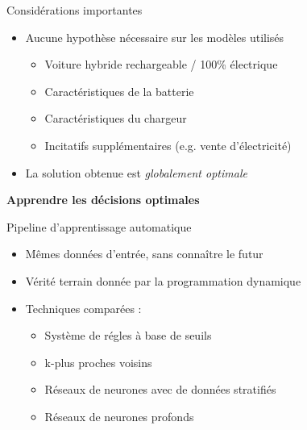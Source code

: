 \documentclass[french]{beamer}
\begin{document}
{ \begin{frame}{Considérations importantes}
 \begin{itemize}
 	\item Aucune hypothèse nécessaire sur les modèles utilisés
 	\begin{itemize}
 		\item Voiture hybride rechargeable / 100\% électrique
 		\item Caractéristiques de la batterie
 		\item Caractéristiques du chargeur
 		\item Incitatifs supplémentaires (e.g. vente d'électricité)
 	\end{itemize}
 	\item La solution obtenue est \emph{globalement optimale}
 \end{itemize}
 \end{frame}
 
 


\begin{frame}
\begin{center}
\huge \textbf{Apprendre les décisions optimales}
\end{center}
\end{frame}

\begin{frame}{Pipeline d'apprentissage automatique}
\begin{itemize}
	\item Mêmes données d'entrée, sans connaître le futur
	\item Vérité terrain donnée par la programmation dynamique
	\item Techniques comparées :
	\begin{itemize}
		\item Système de régles à base de seuils
		\item k-plus proches voisins
		\item Réseaux de neurones avec de données stratifiés
		 \item Réseaux de neurones profonds
 
	\end{itemize}
\end{itemize}

\end{frame}


}
\end{document}
